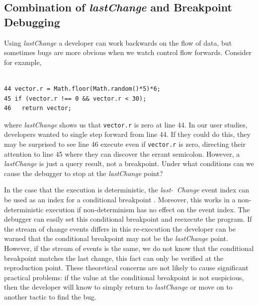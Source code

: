 \documentclass{sig-alternate}
\begin{document}
\subsection{Combination of {\large\bf\textit{lastChange}} and Breakpoint Debugging}
\label{sec:pausing}
Using \textit{lastChange} a developer can work backwards on the flow of data, but sometimes bugs are more obvious when
we watch control flow forwards. Consider for example, 

\lstset{basicstyle=\scriptsize}
\begin{lstlisting}[frame=single, language=myLang] % framerule=0pt]

44 vector.r = Math.floor(Math.random()*5)*6;
45 if (vector.r !== 0 && vector.r < 30);
46   return vector;
\end{lstlisting}
where \textit{lastChange} shows us that \texttt{vector.r} is zero at line 44. In our user studies, developers
wanted to single step forward from line 44. If they could do this, they may be surprised to see line 46 execute 
even if \texttt{vector.r} is zero, directing their attention to line 45 where they can discover the errant semicolon.
However, a \textit{lastChange} is just a query result, not a breakpoint. Under what conditions can we 
cause the debugger to stop at the \textit{lastChange} point?

In the case that the execution is deterministic, the \textit{last-\ Change}
event index can be used as an index for a conditional breakpoint \cite{Boothe, Maruyama}. 
Moreover, this works in a non-deterministic execution if non-determinism
has no effect on the event index.  The debugger can easily set this conditional breakpoint
and reexecute the program. If the stream of change events differs in this re-execution the
developer can be warned that the conditional breakpoint may not be the \textit{lastChange} point.
However, if the stream of events is the same, we do not know that the 
conditional breakpoint matches the last 
change, this fact can only be verified at the reproduction point. These theoretical concerns are not
likely to cause significant practical problems: if the value at the conditional breakpoint is not suspicious, 
then the developer will know to simply return to \textit{lastChange} or move on to another tactic to find the bug.
\end{document}
